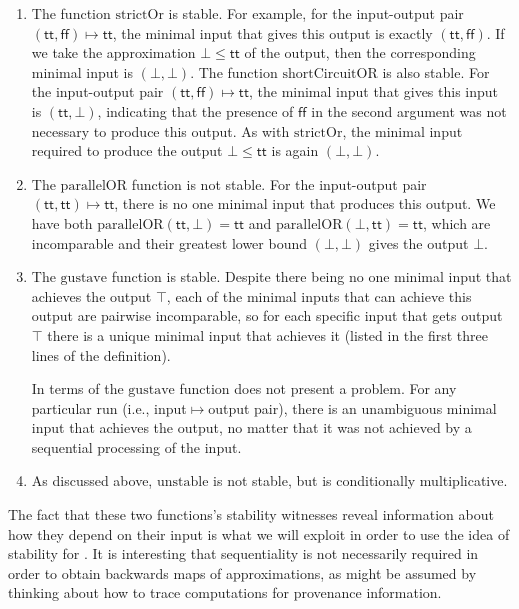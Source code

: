 \begin{example}
  \begin{enumerate}
  \item The function $\mathrm{strictOr}$ is stable. For example, for the input-output pair $(\mathsf{tt},\mathsf{ff}) \mapsto \mathsf{tt}$, the minimal input that gives this output is exactly $(\mathsf{tt}, \mathsf{ff})$. If we take the approximation $\bot \leq \mathsf{tt}$ of the output, then the corresponding minimal input is $(\bot, \bot)$. The function $\mathrm{shortCircuitOR}$ is also stable. For the input-output pair $(\mathsf{tt},\mathsf{ff}) \mapsto \mathsf{tt}$, the minimal input that gives this input is $(\mathsf{tt},\bot)$, indicating that the presence of $\mathsf{ff}$ in the second argument was not necessary to produce this output. As with $\mathrm{strictOr}$, the minimal input required to produce the output $\bot \leq \mathsf{tt}$ is again $(\bot,\bot)$.

  \item The $\mathrm{parallelOR}$ function is not stable. For the input-output pair $(\mathsf{tt},\mathsf{tt}) \mapsto \mathsf{tt}$, there is no one minimal input that produces this output. We have both $\mathrm{parallelOR}(\mathsf{tt},\bot) = \mathsf{tt}$ and $\mathrm{parallelOR}(\bot,\mathsf{tt}) = \mathsf{tt}$, which are incomparable and their greatest lower bound $(\bot,\bot)$ gives the output $\bot$.

  \item The $\mathrm{gustave}$ function is stable. Despite there being no one minimal input that achieves the output $\top$, each of the minimal inputs that can achieve this output are pairwise incomparable, so for each specific input that gets output $\top$ there is a unique minimal input that achieves it (listed in the first three lines of the definition).

    In terms of \GPS the $\mathrm{gustave}$ function does not present a problem. For any particular run (i.e., input$\mapsto$output pair), there is an unambiguous minimal input that achieves the output, no matter that it was not achieved by a sequential processing of the input.

  \item As discussed above, $\mathrm{unstable}$ is not stable, but is conditionally multiplicative.
  \end{enumerate}
\end{example}

The fact that these two functions's stability witnesses reveal information about how they depend on their input is what we will exploit in order to use the idea of stability for \GPS. It is interesting that sequentiality is not necessarily required in order to obtain backwards maps of approximations, as might be assumed by thinking about how to trace computations for provenance information.

